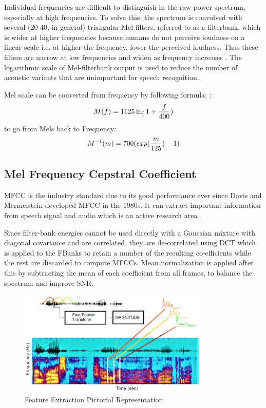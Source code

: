 Individual frequencies are difficult to distinguish in the raw power spectrum, especially at high frequencies.  To solve this, the spectrum is convolved with several (20-40, in general) triangular Mel filters, referred to as a filterbank, which is wider at higher frequencies because humans do not perceive loudness on a linear scale i.e. at higher the frequency, lower the perceived loudness. Thus these filters are narrow at low frequencies and widen as frequency increases \cite{raj_note_nodate}. The logarithmic scale of Mel-filterbank output is used to reduce the number of acoustic variants that are unimportant for speech recognition. 

Mel scale can be converted from frequency by following formula: \cite{backstrom_introduction_2022}:
\begin{equation}
    M(f)=1125\ln_(1+\frac{f}{400}) \\
\end{equation}
to go from Mels back to Frequency: \\
\begin{equation}
    M^{-1}(m)=700(exp(\frac{m}{125})-1) \\
\end{equation}

\subsection{Mel Frequency Cepstral Coefficient}

MFCC is the industry standard due to its good performance ever since Davis and Mermelstein developed MFCC in the 1980s. It can extract important information from speech signal and audio which is an active research area \cite{noauthor_mfcc_nodate}. 

Since filter-bank energies cannot be used directly with a Gaussian mixture with diagonal covariance and are correlated, they are de-correlated using DCT which is applied to the FBanks to retain a number of the resulting co-efficients while the rest are discarded to compute MFCCs. Mean normalization is applied after this by subtracting the mean of each coefficient from all frames, to balance the spectrum and improve SNR. 

\begin{figure}[h]
    \centering
    \includegraphics[width=0.8\textwidth]{img/feature extraction22.png}
    \caption{Feature Extraction Pictorial Representation}
    \label{fig:Feature-extraction-pic}
\end{figure}

